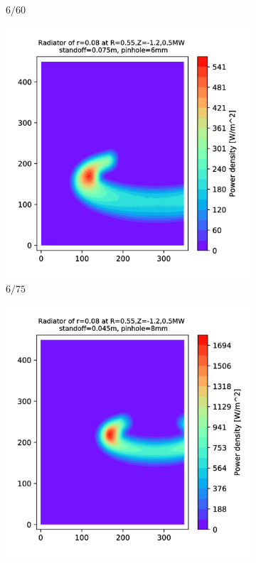 \begin{figure}
\begin{subfigure}{0.3\textwidth}
         \caption{$6/60$}
         \label{fig:6_60}
     \end{subfigure}
     \hfill
     \begin{subfigure}{0.325\textwidth}
         \centering
         \includegraphics[trim={70 0 0 0},clip,width=\textwidth]{Chapters/appendix1/figs/6_75.png}
         \caption{$6/75$}
         \label{fig:6_75}
     \end{subfigure}
     \begin{subfigure}{0.3\textwidth}
         \centering
         \includegraphics[trim={70 0 110 0},clip,width=\textwidth]{Chapters/appendix1/figs/8_45.png}

\end{subfigure}
\end{figure}
